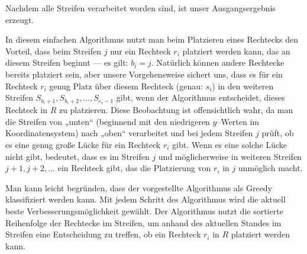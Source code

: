 Nachdem alle Streifen verarbeitet worden sind, ist unser Ausgangsergebnis erzeugt.

In diesem einfachen Algorithmus nutzt man beim Platzieren eines Rechtecks den
Vorteil, dass beim Streifen $j$ nur ein Rechteck $r_i$ platziert werden kann, 
das an diesem Streifen beginnt --- es gilt: $b_i = j$.
Natürlich können andere Rechtecke bereits platziert sein,
aber unsere Vorgehensweise sichert uns, dass es für ein Rechteck $r_i$
genug Platz über diesem Rechteck (genau: $s_i$)
in den weiteren Streifen $S_{b_i + 1}, S_{b_i + 2}, ..., S_{e_i - 1}$ 
gibt, wenn der Algorithmus entscheidet, dieses Rechteck in $R$ zu platzieren.
Diese Beobachtung ist offensichtlich wahr, da man die Streifen von „unten“ 
(beginnend mit den niedrigeren $y$--Werten im Koordinatensystem) nach „oben“
verarbeitet und bei jedem Streifen $j$ prüft, ob es eine genug große Lücke für ein Rechteck
$r_i$ gibt.
Wenn es eine solche Lücke nicht gibt, bedeutet, dass es im Streifen $j$ und 
möglicherweise in weiteren Streifen $j+1, j+2, ...$ ein Rechteck gibt, das 
die Platzierung von $r_i$ in $j$ unmöglich macht.

Man kann leicht begründen, dass der vorgestellte Algorithmus als Greedy klassifiziert werden
kann.
Mit jedem Schritt des Algorithmus wird die aktuell beste Verbesserungsmöglichkeit gewählt.
Der Algorithmus nutzt die sortierte Reihenfolge der Rechtecke im Streifen, um anhand
des aktuellen Standes im Streifen eine Entscheidung zu treffen, ob ein Rechteck $r_i$ in $R$
platziert werden kann.



